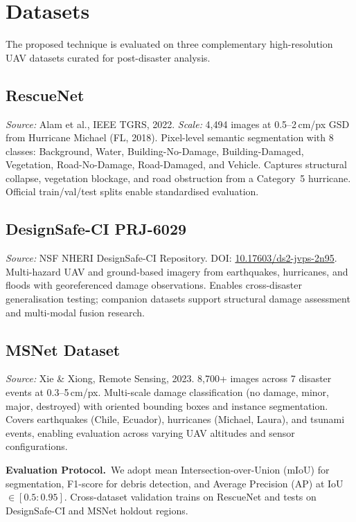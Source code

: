 \documentclass[10pt,a4paper,twocolumn]{article}
\begin{document}
\section{Datasets}

The proposed technique is evaluated on three complementary high-resolution UAV
datasets curated for post-disaster analysis.

\subsection{RescueNet}
\textit{Source:} Alam et al., IEEE TGRS, 2022.
\textit{Scale:} 4,494 images at 0.5--2\,cm/px GSD from Hurricane Michael (FL, 2018).
Pixel-level semantic segmentation with 8 classes: Background, Water,
Building-No-Damage, Building-Damaged, Vegetation, Road-No-Damage, Road-Damaged,
and Vehicle. Captures structural collapse, vegetation blockage, and road
obstruction from a Category~5 hurricane. Official train/val/test splits enable
standardised evaluation.

\subsection{DesignSafe-CI PRJ-6029}
\textit{Source:} NSF NHERI DesignSafe-CI Repository.
DOI: \href{https://doi.org/10.17603/ds2-jvps-2n95}{10.17603/ds2-jvps-2n95}.
Multi-hazard UAV and ground-based imagery from earthquakes, hurricanes, and floods
with georeferenced damage observations. Enables cross-disaster generalisation
testing; companion datasets support structural damage assessment and multi-modal
fusion research.

\subsection{MSNet Dataset}
\textit{Source:} Xie \& Xiong, Remote Sensing, 2023.
8,700+ images across 7 disaster events at 0.3--5\,cm/px.
Multi-scale damage classification (no damage, minor, major, destroyed) with
oriented bounding boxes and instance segmentation. Covers earthquakes (Chile,
Ecuador), hurricanes (Michael, Laura), and tsunami events, enabling evaluation
across varying UAV altitudes and sensor configurations.

\smallskip
\textbf{Evaluation Protocol.}~We adopt mean Intersection-over-Union (mIoU) for
segmentation, F1-score for debris detection, and Average Precision (AP) at IoU
$\in[0.5{:}0.95]$. Cross-dataset validation trains on RescueNet and tests on
DesignSafe-CI and MSNet holdout regions.
\end{document}
